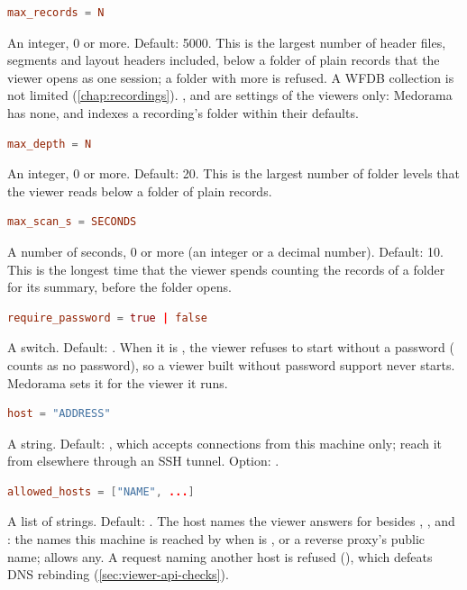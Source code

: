 \begin{lstlisting}[style=signature,language=TOML]
max_records = N
\end{lstlisting}
An integer, 0 or more. Default: 5000. This is the largest number of header files, segments and
layout headers included, below a folder of plain records that the viewer opens as one session; a
folder with more is refused. A WFDB collection is not limited (\cref{chap:recordings}).
,  and  are settings of the viewers only:
Medorama has none, and indexes a recording's folder within their defaults.

\begin{lstlisting}[style=signature,language=TOML]
max_depth = N
\end{lstlisting}
An integer, 0 or more. Default: 20. This is the largest number of folder levels that the viewer
reads below a folder of plain records.

\begin{lstlisting}[style=signature,language=TOML]
max_scan_s = SECONDS
\end{lstlisting}
A number of seconds, 0 or more (an integer or a decimal number). Default: 10. This is the
longest time that the viewer spends counting the records of a folder for its summary, before the
folder opens.

\begin{lstlisting}[style=signature,language=TOML]
require_password = true | false
\end{lstlisting}
A switch. Default: . When it is , the viewer refuses to start without a
password ( counts as no password), so a viewer built without password support
never starts. Medorama sets it for the viewer it runs.

\begin{lstlisting}[style=signature,language=TOML]
host = "ADDRESS"
\end{lstlisting}
A string. Default: , which accepts connections from this machine only; reach
it from elsewhere through an SSH tunnel. Option: .

\begin{lstlisting}[style=signature,language=TOML]
allowed_hosts = ["NAME", ...]
\end{lstlisting}
A list of strings. Default: \code{[]}. The host names the viewer answers for besides
, ,  and : the names this machine is
reached by when  is , or a reverse proxy's public name; \code{["*"]}
allows any. A request naming another host is refused (), which defeats DNS rebinding
(\cref{sec:viewer-api-checks}).

